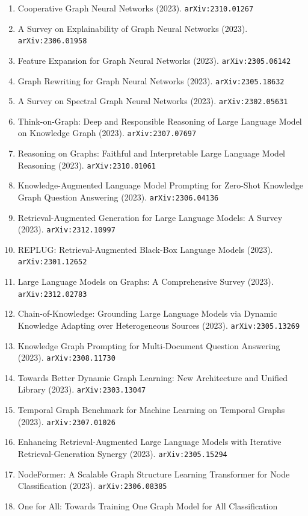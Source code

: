 \documentclass[11pt]{article}
\begin{document}
\begin{enumerate}
  \item Cooperative Graph Neural Networks (2023). \texttt{arXiv:2310.01267}
  \item A Survey on Explainability of Graph Neural Networks (2023). \texttt{arXiv:2306.01958}
  \item Feature Expansion for Graph Neural Networks (2023). \texttt{arXiv:2305.06142}
  \item Graph Rewriting for Graph Neural Networks (2023). \texttt{arXiv:2305.18632}
  \item A Survey on Spectral Graph Neural Networks (2023). \texttt{arXiv:2302.05631}
  \item Think-on-Graph: Deep and Responsible Reasoning of Large Language Model
  on Knowledge Graph (2023). \texttt{arXiv:2307.07697}
  \item Reasoning on Graphs: Faithful and Interpretable Large Language Model
  Reasoning (2023). \texttt{arXiv:2310.01061}
  \item Knowledge-Augmented Language Model Prompting for Zero-Shot Knowledge
  Graph Question Answering (2023). \texttt{arXiv:2306.04136}
  \item Retrieval-Augmented Generation for Large Language Models: A Survey (2023). \texttt{arXiv:2312.10997}
  \item REPLUG: Retrieval-Augmented Black-Box Language Models (2023). \texttt{arXiv:2301.12652}
  \item Large Language Models on Graphs: A Comprehensive Survey (2023). \texttt{arXiv:2312.02783}
  \item Chain-of-Knowledge: Grounding Large Language Models via Dynamic
  Knowledge Adapting over Heterogeneous Sources (2023). \texttt{arXiv:2305.13269}
  \item Knowledge Graph Prompting for Multi-Document Question Answering (2023). \texttt{arXiv:2308.11730}
  \item Towards Better Dynamic Graph Learning: New Architecture and Unified
  Library (2023). \texttt{arXiv:2303.13047}
  \item Temporal Graph Benchmark for Machine Learning on Temporal Graphs (2023). \texttt{arXiv:2307.01026}
  \item Enhancing Retrieval-Augmented Large Language Models with Iterative
  Retrieval-Generation Synergy (2023). \texttt{arXiv:2305.15294}
  \item NodeFormer: A Scalable Graph Structure Learning Transformer for Node
  Classification (2023). \texttt{arXiv:2306.08385}
  \item One for All: Towards Training One Graph Model for All Classification

\end{enumerate}
\end{document}
